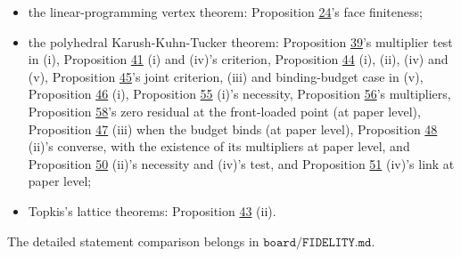 \documentclass[11pt]{article}
\begin{document}
\begin{itemize}
  \item the linear-programming vertex theorem: Proposition \hyperref[res:Proposition-24]{24}'s face
  finiteness;
  \item the polyhedral Karush-Kuhn-Tucker theorem: Proposition \hyperref[res:Proposition-39]{39}'s
  multiplier test in (i), Proposition \hyperref[res:Proposition-41]{41} (i) and (iv)'s criterion,
  Proposition \hyperref[res:Proposition-44]{44} (i), (ii), (iv) and (v), Proposition \hyperref[res:Proposition-45]{45}'s joint
  criterion, (iii) and binding-budget case in (v), Proposition \hyperref[res:Proposition-46]{46}
  (i), Proposition \hyperref[res:Proposition-55]{55} (i)'s necessity, Proposition \hyperref[res:Proposition-56]{56}'s multipliers,
  Proposition \hyperref[res:Proposition-58]{58}'s zero residual at the front-loaded point (at paper
  level),
  Proposition \hyperref[res:Proposition-47]{47} (iii) when the
  budget binds (at paper level),
  Proposition \hyperref[res:Proposition-48]{48} (ii)'s converse, with the existence of its
  multipliers at paper level, and Proposition \hyperref[res:Proposition-50]{50} (ii)'s necessity and
  (iv)'s test, and Proposition \hyperref[res:Proposition-51]{51} (iv)'s link at paper level;
  \item Topkis's lattice theorems: Proposition \hyperref[res:Proposition-43]{43} (ii).
\end{itemize}

The detailed statement
comparison belongs in \(\texttt{board/FIDELITY.md}\).



\end{document}
